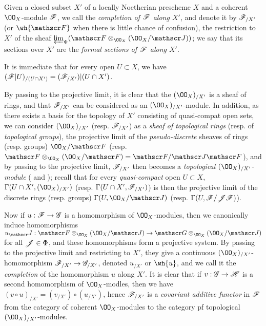 \begin{defn}[10.8.4]
\label{1.10.8.4}
Given a closed subset $X'$ of a locally Noetherian prescheme $X$ and a coherent $\OO_X$-module $\mathscr{F}$, we call the \emph{completion of $\mathscr{F}$ along $X'$}, and denote it by $\mathscr{F}_{/X'}$ (or $\wh{\sh{F}}$ when there is little chance of confusion), the restriction to $X'$ of the sheaf
$\varprojlim_\Phi(\sh{F}\otimes_{\OO_X}(\OO_X/\sh{J}))$; we say that its sections over $X'$ are the \emph{formal sections of $\mathscr{F}$ along $X'$}.
\end{defn}

It is immediate that for every open $U\subset X$, we have $(\mathscr{F}|U)_{/(U\cap X')}=(\mathscr{F}_{/X'})|(U\cap X')$.

By passing to the projective limit, it is clear that the $(\OO_X)_{/X'}$ is a sheaf of rings, and that $\mathscr{F}_{/X'}$ can be considered as an $(\OO_X)_{/X'}$-module.
In addition, as there exists a basis for the topology of $X'$ consisting of quasi-compat open sets, we can consider $(\OO_X)_{/X'}$ (resp. $\mathscr{F}_{/X'}$) as a \emph{sheaf of topological rings} (resp. of \emph{topological groups}), the projective limit of the \emph{pseudo-discrete} sheaves of rings (resp. groups) $\OO_X/\sh{F}$ (resp. $\sh{F}\otimes_{\OO_X}(\OO_X/\sh{F})=\sh{F}/\sh{J}\sh{F}$), and by passing to the projective limit, $\mathscr{F}_{/X'}$ then becomes a \emph{topological $(\OO_X)_{/X'}$-module} ( and ); recall that for every \emph{quasi-compact} open $U\subset X$, $\Gamma(U\cap X',(\OO_X)_{/X'})$ (resp. $\Gamma(U\cap X',\mathscr{F}_{/X'})$) is then the projective limit of the discrete rings (resp. groups) $\Gamma(U,\OO_X/\sh{J})$ (resp. $\Gamma(U,\mathscr{F}/\mathscr{J}\mathscr{F})$).

Now if $u:\sh{F}\to\sh{G}$ is a homomorphism of $\OO_X$-modules, then we canonically induce homomorphisms $u_\sh{J}:\sh{F}\otimes_{\OO_X}(\OO_X/\sh{J})\to\sh{G}\otimes_{\OO_X}(\OO_X/\sh{J})$ for all $\mathscr{J}\in\Phi$, and these homomorphisms form a projective system.
By passing to the projective limit and restricting to $X'$, they give a continuous $(\OO_X)_{/X'}$-homomorphism $\sh{F}_{/X'}\to\sh{G}_{/X'}$, denoted $u_{/X'}$ or $\wh{u}$, and we call it the \emph{completion} of the homomorphism $u$ along $X'$.
It is clear that if $v:\sh{G}\to\sh{H}$ is a second homomorphism of $\OO_X$-modles, then we have $(v\circ u)_{/X'}=(v_{/X'})\circ(u_{/X'})$, hence $\mathscr{F}_{/X'}$ is a \emph{covariant additive functor} in $\mathscr{F}$ from the category of coherent $\OO_X$-modules to the category pf topological $(\OO_X)_{/X'}$-modules.

